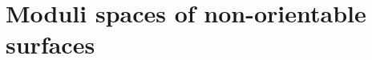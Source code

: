 \date{Tuesday, April 2\textsuperscript{nd} 2024}

\subject{Mathematics}






\begin{frame}
  \titlepage
\end{frame}

\section{Moduli spaces of non-orientable surfaces}

